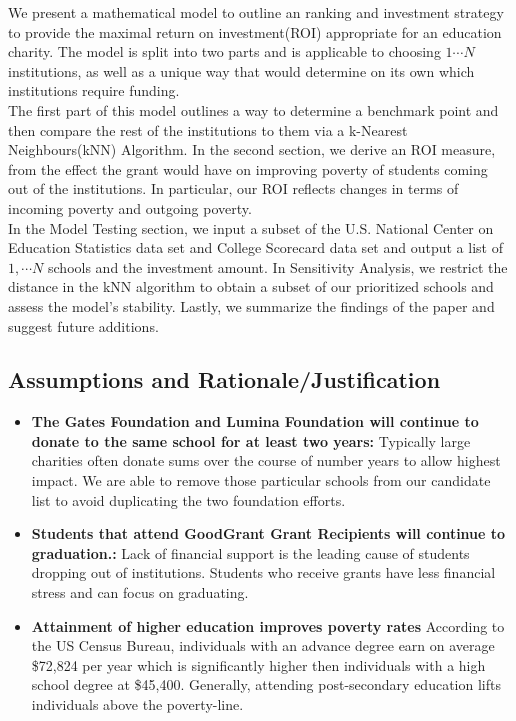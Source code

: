 \documentclass[12pt]{scrartcl}
\begin{document}
		We present a mathematical model to outline an ranking and investment strategy to provide the maximal return on investment(ROI) appropriate for an education charity.  The model is split into two parts and is applicable to choosing $1\cdots N$ institutions, as well as a unique way that would determine on its own which institutions require funding. \\

		The first part of this model outlines a way to determine a benchmark point and then compare the rest of the institutions to them via a k-Nearest Neighbours(kNN) Algorithm. In the second section, we derive an ROI measure, from the effect the grant would have on improving poverty of students coming out of the institutions. In particular, our ROI reflects changes in terms of incoming poverty and outgoing poverty.\\ 

		In the Model Testing section, we input a subset of the U.S. National Center on Education Statistics data set and College Scorecard data set and output a list of $1,\cdots{N}$ schools and the investment amount. In Sensitivity Analysis, we restrict the distance in the kNN algorithm to obtain a subset of our prioritized schools and assess the model's stability. Lastly, we summarize the findings of the paper and suggest future additions. 
	
	\subsection{Assumptions and Rationale/Justification}
	\begin{itemize}
		\item \textbf{The Gates Foundation and Lumina Foundation will continue to donate to the same school for at least two years:} Typically large charities often donate sums over the course of number years to allow highest impact. \cite{Conkey} We are able to remove those particular schools from our candidate list to avoid duplicating the two foundation efforts. 
				
		\item \textbf{Students that attend GoodGrant Grant Recipients will continue to graduation.:}  Lack of financial support is the leading cause of students dropping out of institutions. Students who receive grants have less financial stress and can focus on graduating.\cite{Trom}
		
		\item \textbf{Attainment of higher education improves poverty rates} According to the US Census Bureau, individuals with an advance degree earn on average \$72,824 per year which is significantly higher then individuals with a high school degree at \$45,400.\cite{dis} Generally, attending post-secondary education lifts individuals above the poverty-line. 

	\end{itemize}
	
\end{document}
